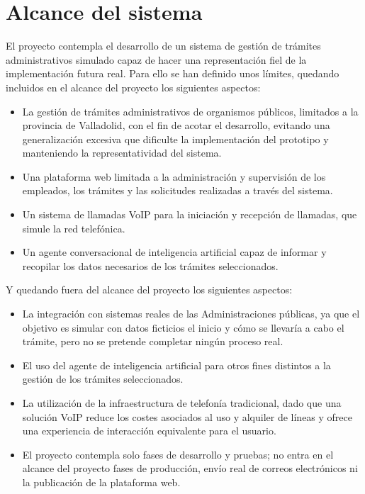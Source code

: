 \section{Alcance del sistema}
    El proyecto contempla el desarrollo de un sistema de gestión de trámites administrativos simulado capaz de hacer una representación fiel de la implementación futura real. 
    Para ello se han definido unos límites, quedando incluidos en el alcance del proyecto los siguientes aspectos:
    \begin{itemize}
        \item La gestión de trámites administrativos de organismos públicos, limitados a la provincia de Valladolid, con el fin de acotar el desarrollo, evitando una generalización excesiva que dificulte la implementación del prototipo y manteniendo la representatividad del sistema.
        \item Una plataforma web limitada a la administración y supervisión de los empleados, los trámites y las solicitudes realizadas a través del sistema.
        \item Un sistema de llamadas VoIP para la iniciación y recepción de llamadas, que simule la red telefónica.
        \item Un agente conversacional de inteligencia artificial capaz de informar y recopilar los datos necesarios de los trámites seleccionados.
    \end{itemize}
    Y quedando fuera del alcance del proyecto los siguientes aspectos:
    \begin{itemize}
        \item La integración con sistemas reales de las Administraciones públicas, ya que el objetivo es simular con datos ficticios el inicio y cómo se llevaría a cabo el trámite, pero no se pretende completar ningún proceso real.
        \item El uso del agente de inteligencia artificial para otros fines distintos a la gestión de los trámites seleccionados.
        \item La utilización de la infraestructura de telefonía tradicional, dado que una solución VoIP reduce los costes asociados al uso y alquiler de líneas y ofrece una experiencia de interacción equivalente para el usuario.
        \item El proyecto contempla solo fases de desarrollo y pruebas; no entra en el alcance del proyecto fases de producción, envío real de correos electrónicos ni la publicación de la plataforma web.
    \end{itemize}
        
